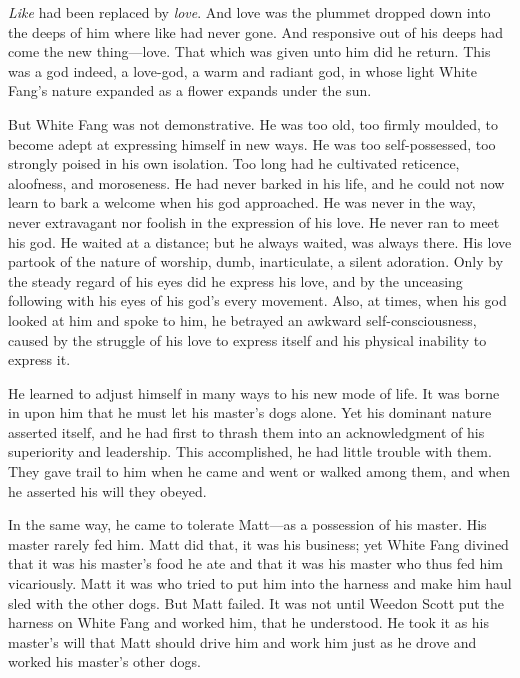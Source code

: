 \documentclass[10pt]{book}
\begin{document}
\emph{Like} had been replaced by \emph{love}. And love was the plummet dropped
down into the deeps of him where like had never gone. And responsive
out of his deeps had come the new thing—love. That which was given unto
him did he return. This was a god indeed, a love-god, a warm and
radiant god, in whose light White Fang’s nature expanded as a flower
expands under the sun.

But White Fang was not demonstrative. He was too old, too firmly
moulded, to become adept at expressing himself in new ways. He was too
self-possessed, too strongly poised in his own isolation. Too long had
he cultivated reticence, aloofness, and moroseness. He had never barked
in his life, and he could not now learn to bark a welcome when his god
approached. He was never in the way, never extravagant nor foolish in
the expression of his love. He never ran to meet his god. He waited at
a distance; but he always waited, was always there. His love partook of
the nature of worship, dumb, inarticulate, a silent adoration. Only by
the steady regard of his eyes did he express his love, and by the
unceasing following with his eyes of his god’s every movement. Also, at
times, when his god looked at him and spoke to him, he betrayed an
awkward self-consciousness, caused by the struggle of his love to
express itself and his physical inability to express it.

He learned to adjust himself in many ways to his new mode of life. It
was borne in upon him that he must let his master’s dogs alone. Yet his
dominant nature asserted itself, and he had first to thrash them into
an acknowledgment of his superiority and leadership. This accomplished,
he had little trouble with them. They gave trail to him when he came
and went or walked among them, and when he asserted his will they
obeyed.

In the same way, he came to tolerate Matt—as a possession of his
master. His master rarely fed him. Matt did that, it was his business;
yet White Fang divined that it was his master’s food he ate and that it
was his master who thus fed him vicariously. Matt it was who tried to
put him into the harness and make him haul sled with the other dogs.
But Matt failed. It was not until Weedon Scott put the harness on White
Fang and worked him, that he understood. He took it as his master’s
will that Matt should drive him and work him just as he drove and
worked his master’s other dogs.
\end{document}
